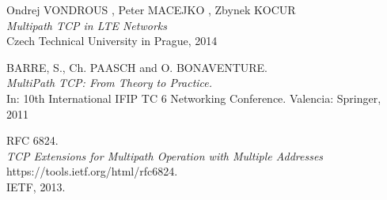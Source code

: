 \documentclass[11pt,twocolumn]{article}
\begin{document}
\begin{thebibliography}{9}

Ondrej VONDROUS , Peter MACEJKO , Zbynek KOCUR \\
\emph{Multipath TCP in LTE Networks}\\
Czech Technical University in Prague, 2014

BARRE, S., Ch. PAASCH and O. BONAVENTURE.\\
\emph{MultiPath TCP: From Theory to Practice.}\\
In: 10th International IFIP TC 6 Networking
Conference. Valencia: Springer, 2011

RFC 6824.  \\
\emph{TCP Extensions for Multipath Operation with Multiple Addresses} \\ 
https://tools.ietf.org/html/rfc6824.\\ IETF, 2013.


\end{thebibliography}
\end{document}
